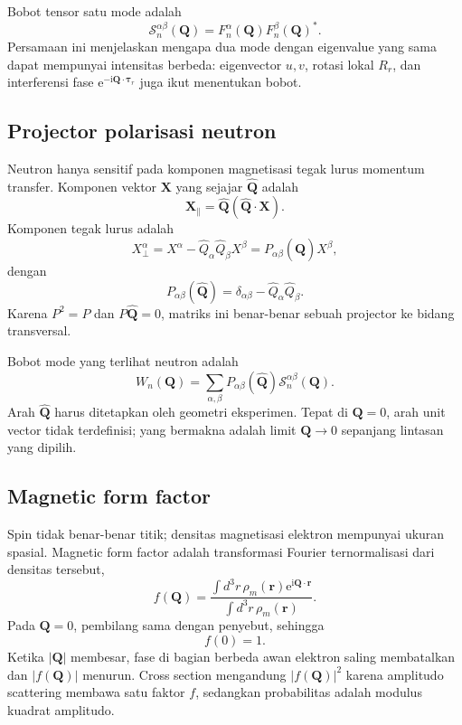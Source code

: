 \documentclass[11pt,a4paper]{article}
\newcommand{\ii}{\mathrm{i}}
\newcommand{\ee}{\mathrm{e}}
\newcommand{\vQ}{\bm Q}
\begin{document}
Bobot tensor satu mode adalah
\begin{equation}
\boxed{
\mathcal S_n^{\alpha\beta}(\vQ)
=F_n^\alpha(\vQ)F_n^\beta(\vQ)^*.}
\label{eq:mode-weight}
\end{equation}
Persamaan ini menjelaskan mengapa dua mode dengan eigenvalue yang sama dapat mempunyai intensitas berbeda: eigenvector $u,v$, rotasi lokal $R_r$, dan interferensi fase $\ee^{-\ii\vQ\cdot\bm\tau_r}$ juga ikut menentukan bobot.

\subsection{Projector polarisasi neutron}

Neutron hanya sensitif pada komponen magnetisasi tegak lurus momentum transfer. Komponen vektor $\bm X$ yang sejajar $\widehat{\vQ}$ adalah
\begin{equation}
\bm X_{\parallel}=\widehat{\vQ}(\widehat{\vQ}\cdot\bm X).
\end{equation}
Komponen tegak lurus adalah
\begin{equation}
X_\perp^\alpha
=X^\alpha-\widehat Q_\alpha\widehat Q_\beta X^\beta
=P_{\alpha\beta}(\widehat{\vQ})X^\beta,
\end{equation}
dengan
\begin{equation}
\boxed{
P_{\alpha\beta}(\widehat{\vQ})
=\delta_{\alpha\beta}-\widehat Q_\alpha\widehat Q_\beta.}
\label{eq:polarization-projector}
\end{equation}
Karena $P^2=P$ dan $P\widehat{\vQ}=0$, matriks ini benar-benar sebuah projector ke bidang transversal.

Bobot mode yang terlihat neutron adalah
\begin{equation}
W_n(\vQ)=
\sum_{\alpha,\beta}
P_{\alpha\beta}(\widehat{\vQ})
\mathcal S_n^{\alpha\beta}(\vQ).
\label{eq:neutron-mode-weight}
\end{equation}
Arah $\widehat{\vQ}$ harus ditetapkan oleh geometri eksperimen. Tepat di $\vQ=0$, arah unit vector tidak terdefinisi; yang bermakna adalah limit $\vQ\to0$ sepanjang lintasan yang dipilih.

\subsection{Magnetic form factor}

Spin tidak benar-benar titik; densitas magnetisasi elektron mempunyai ukuran spasial. Magnetic form factor adalah transformasi Fourier ternormalisasi dari densitas tersebut,
\begin{equation}
f(\vQ)=\frac{\int d^3r\,\rho_m(\bm r)\ee^{\ii\vQ\cdot\bm r}}
{\int d^3r\,\rho_m(\bm r)}.
\label{eq:form-factor-definition}
\end{equation}
Pada $\vQ=0$, pembilang sama dengan penyebut, sehingga
\begin{equation}
f(0)=1.
\end{equation}
Ketika $|\vQ|$ membesar, fase di bagian berbeda awan elektron saling membatalkan dan $|f(\vQ)|$ menurun. Cross section mengandung $|f(\vQ)|^2$ karena amplitudo scattering membawa satu faktor $f$, sedangkan probabilitas adalah modulus kuadrat amplitudo.
\end{document}
